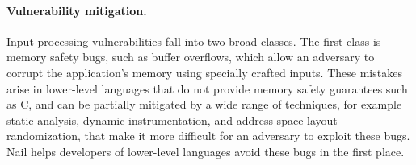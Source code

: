 \paragraph{Vulnerability mitigation.}

Input processing vulnerabilities fall into two broad classes.  The first
class is memory safety bugs, such as buffer overflows, which allow an
adversary to corrupt the application's memory using specially crafted
inputs.  These mistakes arise in lower-level languages that do not
provide memory safety guarantees such as C, and can be partially
mitigated by a wide range of techniques, for example static analysis,
dynamic instrumentation, and address space layout randomization, that
make it more difficult for an adversary to exploit these bugs.
Nail helps developers of lower-level languages avoid these bugs
in the first place.

